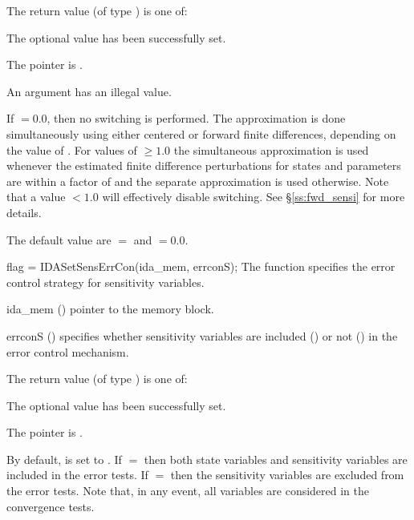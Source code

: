 {
  The return value  (of type ) is one of:
  \begin{args}
  \item[\Id{IDA\_SUCCESS}]
    The optional value has been successfully set.
  \item[\Id{IDA\_MEM\_NULL}]
    The  pointer is .
  \item[\Id{IDA\_ILL\_INPUT}]
    An argument has an illegal value.
  \end{args}
}
{
  If  $= 0.0$, then no switching is performed. The approximation is done simultaneously
  using either centered or forward finite differences, depending on the value of . 
  For values of  $\ge 1.0$ the simultaneous approximation is used whenever the 
  estimated finite difference perturbations for states and parameters are within a factor of
   and the separate approximation is used otherwise. Note that a value 
   $< 1.0$ will effectively disable switching.   
  See \S\ref{ss:fwd_sensi} for more details.

  The default value are $=$ and $=0.0$. 
}
{
  flag = IDASetSensErrCon(ida\_mem, errconS);
}
{
  The function  specifies the error control
  strategy for sensitivity variables.
}
{
  \begin{args}
  \item[ida\_mem] ()
    pointer to the {\idas} memory block.
  \item[errconS] ()
    specifies whether sensitivity variables are included () or not
    () in the error control mechanism.
  \end{args}
}
{
  The return value  (of type ) is one of:
  \begin{args}
  \item[\Id{IDA\_SUCCESS}] 
    The optional value has been successfully set.
  \item[\Id{IDA\_MEM\_NULL}]
    The  pointer is .
  \end{args}
}
{
  By default,  is set to . 
  If $=$ then both state variables and
  sensitivity variables are included in the error tests. 
  If $=$ then the sensitivity variables are excluded from the 
  error tests. Note that, in any event, all variables are considered in the convergence 
  tests.
}
